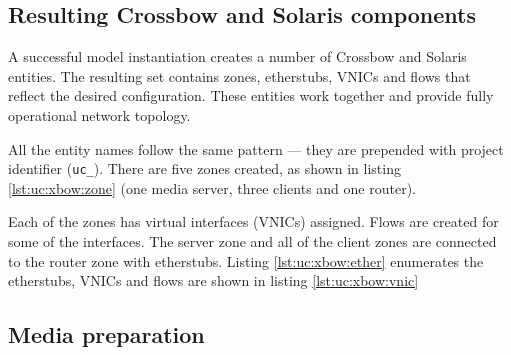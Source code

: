 \documentclass[11pt]{book}
\begin{document}
      
      
      \subsection{Resulting Crossbow and Solaris components}
      \label{sub:uc:xbow}

        A successful model instantiation creates a number of Crossbow and Solaris entities. The resulting set contains
        zones, etherstubs, VNICs and flows that reflect the desired configuration. These entities work together and
        provide fully operational network topology.

        All the entity names follow the same pattern --- they are prepended with project identifier (\texttt{uc\_}).
        There are five zones created, as shown in listing \ref{lst:uc:xbow:zone} (one media server, three clients and
        one router). \\

        \noindent
        \begin{minipage}{\textwidth}
          
        \end{minipage}

        Each of the zones has virtual interfaces (VNICs) assigned. Flows are created for some of the interfaces. The
        server zone and all of the client zones are connected to the router zone with etherstubs. Listing
        \ref{lst:uc:xbow:ether} enumerates the etherstubs, VNICs and flows are shown in listing \ref{lst:uc:xbow:vnic} \\

        \noindent
        \begin{minipage}{\textwidth}
          
        \end{minipage}

        \noindent
        \begin{minipage}{\textwidth}
          
        \end{minipage}


      \subsection{Media preparation}
      \label{sub:}
\end{document}
